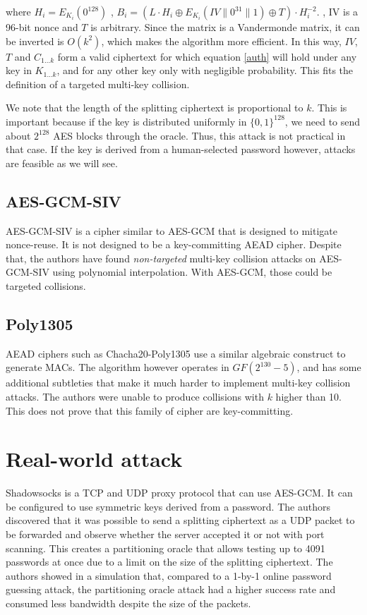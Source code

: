 \documentclass[9pt, a4paper]{article}
\begin{document}
where
$H_i = E_{K_i}(0^{128})$
,
$B_i = (L \cdot H_i \oplus E_{K_i}(IV \parallel 0^{31} \parallel 1) \oplus T) \cdot H_i^{-2}$.
,
IV is a 96-bit nonce
and
$T$ is arbitrary.
Since the matrix is a Vandermonde matrix, it can be inverted is $O(k^2)$, which makes the algorithm more efficient.
In this way, $IV$, $T$ and $C_{1...k}$ form a valid ciphertext for which equation \ref{auth} will hold under any key in $K_{1...k}$, and for any other key only with negligible probability.
This fits the definition of a targeted multi-key collision.

We note that the length of the splitting ciphertext is proportional to $k$.
This is important because
if the key is distributed uniformly in $\{0,1\}^{128}$,
we need to send about $2^{128}$ AES blocks through the oracle.
Thus, this attack is not practical in that case.
If the key is derived from a human-selected password however,
attacks are feasible as we will see.

\subsection{AES-GCM-SIV}
AES-GCM-SIV is a cipher similar to AES-GCM that is designed to mitigate nonce-reuse.
It is not designed to be a key-committing AEAD cipher.
Despite that, the authors have found \emph{non-targeted} multi-key collision attacks on AES-GCM-SIV
using polynomial interpolation. With AES-GCM, those could be targeted collisions.

\subsection{Poly1305}
AEAD ciphers such as Chacha20-Poly1305 use a similar algebraic construct to generate MACs.
The algorithm however operates in $GF(2^{130}-5)$, and has some additional subtleties that make it much harder to implement multi-key collision attacks.
The authors were unable to produce collisions with $k$ higher than 10. This does not prove that this family of cipher are key-committing.

\section{Real-world attack}
Shadowsocks\cite{shadowsocks} is a TCP and UDP proxy protocol that can use AES-GCM.
It can be configured to use symmetric keys derived from a password.
The authors discovered that it was possible to send a splitting ciphertext as a
UDP packet to be forwarded and observe whether the server accepted it or not with port scanning.
This creates a partitioning oracle that allows testing up to 4091 passwords at once due to a limit on the size of the splitting ciphertext.
The authors showed in a simulation that,
compared to a 1-by-1 online password guessing attack,
the partitioning oracle attack had a higher success rate and consumed less bandwidth despite the size of the packets.
\end{document}
